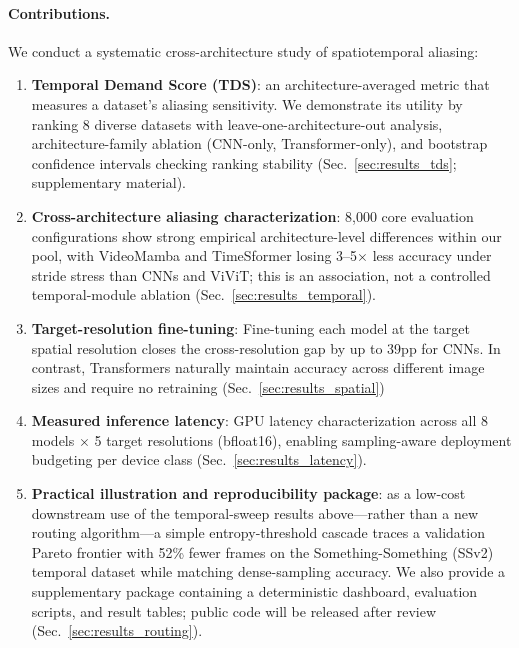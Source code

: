 \documentclass[runningheads]{llncs}
\newcommand{\TDS}{\textsc{TDS}}
\begin{document}
\paragraph{Contributions.}
We conduct a systematic cross-architecture study of spatiotemporal aliasing:
\begin{enumerate}[leftmargin=*,topsep=2pt,itemsep=1pt]
\item \textbf{Temporal Demand Score (\TDS{})}: an architecture-averaged metric that measures a dataset's aliasing sensitivity. We demonstrate its utility by ranking 8 diverse datasets with leave-one-architecture-out analysis, architecture-family ablation (CNN-only, Transformer-only), and bootstrap confidence intervals checking ranking stability (Sec.~\ref{sec:results_tds}; supplementary material). 
\item \textbf{Cross-architecture aliasing characterization}: 8,000 core evaluation
configurations show strong empirical architecture-level differences within our pool, with VideoMamba and TimeSformer losing 3--5$\times$ less accuracy under stride stress than CNNs and ViViT; this is an association, not a controlled temporal-module ablation (Sec.~\ref{sec:results_temporal}).
\item \textbf{Target-resolution fine-tuning}: Fine-tuning each model at the target spatial resolution closes the cross-resolution gap by up to 39pp for CNNs. In contrast, Transformers naturally maintain accuracy across different image sizes and require no retraining (Sec.~\ref{sec:results_spatial})
\item \textbf{Measured inference latency}: GPU latency characterization
across all 8 models $\times$ 5 target resolutions (bfloat16), enabling sampling-aware deployment budgeting per device class (Sec.~\ref{sec:results_latency}).
\item \textbf{Practical illustration and reproducibility package}: as a low-cost downstream use of the temporal-sweep results above---rather than a new routing algorithm---a simple entropy-threshold cascade traces a validation Pareto frontier with 52\% fewer frames on the Something-Something (SSv2) temporal dataset while matching dense-sampling accuracy. We also provide a supplementary package containing a deterministic dashboard, evaluation scripts, and result tables; public code will be released after review (Sec.~\ref{sec:results_routing}).
\end{enumerate}
\end{document}
